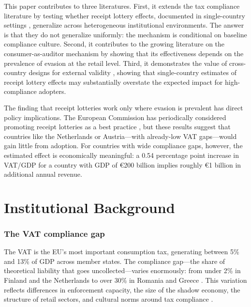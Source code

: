 \documentclass[12pt]{article}
\begin{document}
This paper contributes to three literatures. First, it extends the tax compliance literature \citep{AllinghamandSandmo1972, Slemrod2019, Kleven2014} by testing whether receipt lottery effects, documented in single-country settings \citep{Naritomi2019, Wan2010}, generalize across heterogeneous institutional environments. The answer is that they do not generalize uniformly: the mechanism is conditional on baseline compliance culture. Second, it contributes to the growing literature on the consumer-as-auditor mechanism \citep{Gordon1990, PomeranzandVila-Belda2019, Advani2022} by showing that its effectiveness depends on the prevalence of evasion at the retail level. Third, it demonstrates the value of cross-country designs for external validity \citep{Muralidharan2023}, showing that single-country estimates of receipt lottery effects may substantially overstate the expected impact for high-compliance adopters.

The finding that receipt lotteries work only where evasion is prevalent has direct policy implications. The European Commission has periodically considered promoting receipt lotteries as a best practice \citep{EC2022}, but these results suggest that countries like the Netherlands or Austria---with already-low VAT gaps---would gain little from adoption. For countries with wide compliance gaps, however, the estimated effect is economically meaningful: a 0.54 percentage point increase in VAT/GDP for a country with GDP of \euro{}200 billion implies roughly \euro{}1 billion in additional annual revenue.


\section{Institutional Background}

\subsubsection*{The VAT compliance gap} The VAT is the EU's most important consumption tax, generating between 5\% and 13\% of GDP across member states. The compliance gap---the share of theoretical liability that goes uncollected---varies enormously: from under 2\% in Finland and the Netherlands to over 30\% in Romania and Greece \citep{CASE2023}. This variation reflects differences in enforcement capacity, the size of the shadow economy, the structure of retail sectors, and cultural norms around tax compliance \citep{Alm2012, TorglerandSchneider2007}.
\end{document}
